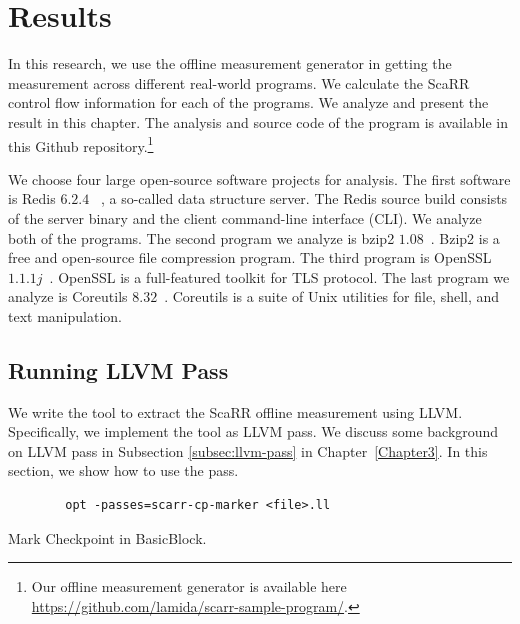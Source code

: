 
\chapter{Results} %

\label{Chapter5} %

In this research, we use the offline measurement generator in getting the
measurement across different real-world programs. We calculate the ScaRR control
flow information for each of the programs. We analyze and present the result in
this chapter. The analysis and source code of the program is available in this
Github repository.\footnote{Our offline measurement generator is available here
\url{https://github.com/lamida/scarr-sample-program/}.}

We choose four large open-source software projects for analysis. The first
software is Redis $6.2.4$ ~\cite{RedisRedis2021}, a so-called data structure
server. The Redis source build consists of the server binary and the client
command-line interface (CLI). We analyze both of the programs. The second
program we analyze is bzip2 $1.08$~\cite{Bzip2Bzip2}. Bzip2 is a free and
open-source file compression program. The third program is OpenSSL
$1.1.1j$~\cite{OpensslOpenssl2021}. OpenSSL is a full-featured toolkit for TLS
protocol. The last program we analyze is Coreutils
$8.32$~\cite{CoreutilsCoreutils2021}. Coreutils is a suite of Unix utilities for
file, shell, and text manipulation.



\section{Running LLVM Pass}
\label{sec:running-llvm-pass}

We write the tool to extract the ScaRR offline measurement using LLVM.
Specifically, we implement the tool as LLVM pass. We discuss some background on
LLVM pass in Subsection \ref{subsec:llvm-pass} in Chapter~\ref{Chapter3}. In
this section, we show how to use the pass.

\begin{listing}[h]
    \begin{verbatim}
        opt -passes=scarr-cp-marker <file>.ll
    \end{verbatim}
    \caption{Mark Checkpoint in BasicBlock.}    
    \label{listing:mark-cp-in-cfg}
\end{listing}

